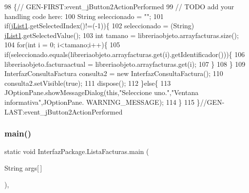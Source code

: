 \begin{DoxyCode}
98                                                                          \{\textcolor{comment}{//
      GEN-FIRST:event\_jButton2ActionPerformed}
99         \textcolor{comment}{// TODO add your handling code here:}
100         String seleccionado = \textcolor{stringliteral}{""};
101         \textcolor{keywordflow}{if}(\mbox{\hyperlink{class_interfaz_package_1_1_lista_facturas_a92c3e7b820b65782c261920bbc6af073}{jList1}}.getSelectedIndex()!=(-1))\{
102             seleccionado = (String) \mbox{\hyperlink{class_interfaz_package_1_1_lista_facturas_a92c3e7b820b65782c261920bbc6af073}{jList1}}.getSelectedValue();
103             \textcolor{keywordtype}{int} tamano = libreriaobjeto.arrayfacturas.size();
104             \textcolor{keywordflow}{for}(\textcolor{keywordtype}{int} i = 0; i<tamano;i++)\{
105                  \textcolor{keywordflow}{if}(seleccionado.equals(libreriaobjeto.arrayfacturas.get(i).getIdentificador()))\{
106                        libreriaobjeto.facturaactual = libreriaobjeto.arrayfacturas.get(i);
107                  \}
108         \}
109             InterfazConsultaFactura consulta2 = \textcolor{keyword}{new} InterfazConsultaFactura();
110             consulta2.setVisible(\textcolor{keyword}{true});
111             dispose();
112         \}\textcolor{keywordflow}{else}\{
113             JOptionPane.showMessageDialog(\textcolor{keyword}{this},\textcolor{stringliteral}{"Seleccione uno."},\textcolor{stringliteral}{"Ventana informativa"},JOptionPane.
      WARNING\_MESSAGE);
114         \}
115     \}\textcolor{comment}{//GEN-LAST:event\_jButton2ActionPerformed}
\end{DoxyCode}
\mbox{\label{class_interfaz_package_1_1_lista_facturas_aeaed8570a89909e2d33828c6d53fbe9e}} 
\subsubsection{\texorpdfstring{main()}{main()}}
{\footnotesize\ttfamily static void Interfaz\+Package.\+Lista\+Facturas.\+main (\begin{DoxyParamCaption}\item[{String}]{args\mbox{[}$\,$\mbox{]} }\end{DoxyParamCaption})\hspace{0.3cm}{\ttfamily [inline]}, {\ttfamily [static]}}


